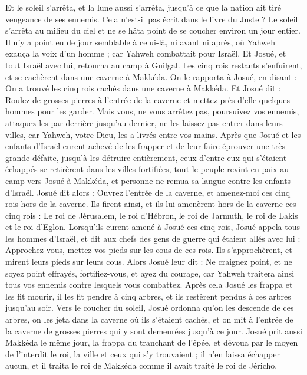 \begin{multicols}{2}
Et le soleil s’arrêta, et la lune aussi s’arrêta, jusqu’à ce que la nation ait tiré vengeance de ses ennemis. Cela n’est-il pas écrit dans le livre du Juste ? Le soleil s’arrêta au milieu du ciel et ne se hâta point de se coucher environ un jour entier.
Il n’y a point eu de jour semblable à celui-là, ni avant ni après, où Yahweh exauça la voix d’un homme ; car Yahweh combattait pour Israël.
Et Josué, et tout Israël avec lui, retourna au camp à Guilgal.
Les cinq rois restants s’enfuirent, et se cachèrent dans une caverne à Makkéda.
On le rapporta à Josué, en disant : On a trouvé les cinq rois cachés dans une caverne à Makkéda.
Et Josué dit : Roulez de grosses pierres à l’entrée de la caverne et mettez près d’elle quelques hommes pour les garder.
Mais vous, ne vous arrêtez pas, poursuivez vos ennemis, attaquez-les par-derrière jusqu’au dernier, ne les laissez pas entrer dans leurs villes, car Yahweh, votre Dieu, les a livrés entre vos mains.
Après que Josué et les enfants d’Israël eurent achevé de les frapper et de leur faire éprouver une très grande défaite, jusqu’à les détruire entièrement, ceux d’entre eux qui s’étaient échappés se retirèrent dans les villes fortifiées,
tout le peuple revint en paix au camp vers Josué à Makkéda, et personne ne remua sa langue contre les enfants d’Israël.
Josué dit alors : Ouvrez l’entrée de la caverne, et amenez-moi ces cinq rois hors de la caverne.
Ils firent ainsi, et ils lui amenèrent hors de la caverne ces cinq rois : Le roi de Jérusalem, le roi d’Hébron, le roi de Jarmuth, le roi de Lakis et le roi d’Eglon.
Lorsqu’ils eurent amené à Josué ces cinq rois, Josué appela tous les hommes d’Israël, et dit aux chefs des gens de guerre qui étaient allés avec lui : Approchez-vous, mettez vos pieds sur les cous de ces rois. Ils s’approchèrent, et mirent leurs pieds sur leurs cous.
Alors Josué leur dit : Ne craignez point, et ne soyez point effrayés, fortifiez-vous, et ayez du courage, car Yahweh traitera ainsi tous vos ennemis contre lesquels vous combattez.
Après cela Josué les frappa et les fit mourir, il les fit pendre à cinq arbres, et ils restèrent pendus à ces arbres jusqu’au soir.
Vers le coucher du soleil, Josué ordonna qu’on les descende de ces arbres, on les jeta dans la caverne où ils s’étaient cachés, et on mit à l’entrée de la caverne de grosses pierres qui y sont demeurées jusqu’à ce jour.
Josué prit aussi Makkéda le même jour, la frappa du tranchant de l’épée, et dévoua par le moyen de l'interdit le roi, la ville et ceux qui s’y trouvaient ; il n’en laissa échapper aucun, et il traita le roi de Makkéda comme il avait traité le roi de Jéricho.

\end{multicols}
